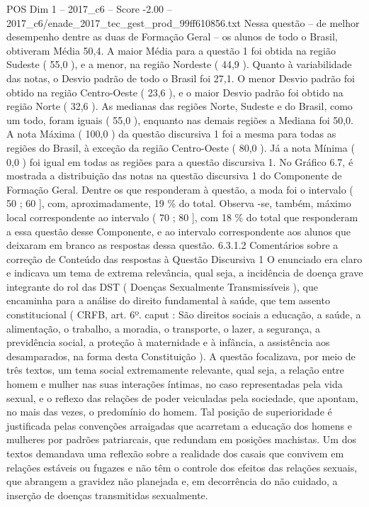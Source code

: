 \begin{textsample}{POS Dim 1 – 2017\_c6 – Score -2.00 – 2017\_c6/enade\_2017\_tec\_gest\_prod\_99ff610856.txt}
Nessa questão – de melhor desempenho dentre as duas de Formação Geral – os alunos de todo o Brasil, obtiveram Média 50,4.
A maior Média para a questão 1 foi obtida na região Sudeste ( 55,0 ), e a menor, na região Nordeste ( 44,9 ).
Quanto à variabilidade das notas, o Desvio padrão de todo o Brasil foi 27,1.
O menor Desvio padrão foi obtido na região Centro-Oeste ( 23,6 ), e o maior Desvio padrão foi obtido na região Norte ( 32,6 ).
As medianas das regiões Norte, Sudeste e do Brasil, como um todo, foram iguais ( 55,0 ), enquanto nas demais regiões a Mediana foi 50,0.
A nota Máxima ( 100,0 ) da questão discursiva 1 foi a mesma para todas as regiões do Brasil, à exceção da região Centro-Oeste ( 80,0 ).
Já a nota Mínima ( 0,0 ) foi igual em todas as regiões para a questão discursiva 1.
No Gráfico 6.7, é mostrada a distribuição das notas na questão discursiva 1 do Componente de Formação Geral.
Dentre os que responderam à questão, a moda foi o intervalo ( 50 ; 60 ], com, aproximadamente, 19 \% do total.
Observa -se, também, máximo local correspondente ao intervalo ( 70 ; 80 ], com 18 \% do total que responderam a essa questão desse Componente, e ao intervalo correspondente aos alunos que deixaram em branco as respostas dessa questão. 6.3.1.2 Comentários sobre a correção de Conteúdo das respostas à Questão Discursiva 1 O enunciado era claro e indicava um tema de extrema relevância, qual seja, a incidência de doença grave integrante do rol das DST ( Doenças Sexualmente Transmissíveis ), que encaminha para a análise do direito fundamental à saúde, que tem assento constitucional ( CRFB, art. 6º. caput : São direitos sociais a educação, a saúde, a alimentação, o trabalho, a moradia, o transporte, o lazer, a segurança, a previdência social, a proteção à maternidade e à infância, a assistência aos desamparados, na forma desta Constituição ).
A questão focalizava, por meio de três textos, um tema social extremamente relevante, qual seja, a relação entre homem e mulher nas suas interações íntimas, no caso representadas pela vida sexual, e o reflexo das relações de poder veiculadas pela sociedade, que apontam, no mais das vezes, o predomínio do homem.
Tal posição de superioridade é justificada pelas convenções arraigadas que acarretam a educação dos homens e mulheres por padrões patriarcais, que redundam em posições machistas.
Um dos textos demandava uma reflexão sobre a realidade dos casais que convivem em relações estáveis ou fugazes e não têm o controle dos efeitos das relações sexuais, que abrangem a gravidez não planejada e, em decorrência do não cuidado, a inserção de doenças transmitidas sexualmente.

\end{textsample}
